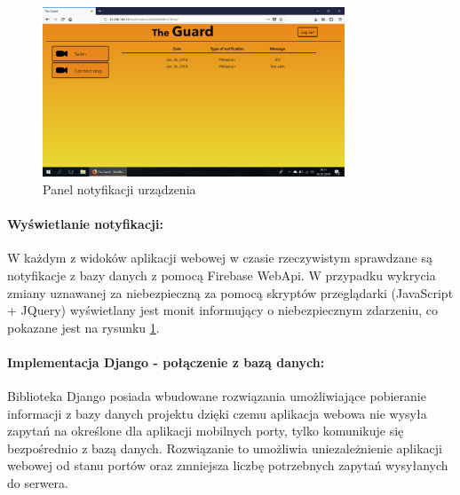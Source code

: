 \begin{figure}[ht]
	\centering
	\includegraphics[width=9cm]{web_screenshots/rasp_notifications.png}
	\caption{Panel notyfikacji urządzenia}
	\label{web_rasp_notifications}
\end{figure}
\paragraph{Wyświetlanie notyfikacji:} W każdym z widoków aplikacji webowej w czasie rzeczywistym sprawdzane są notyfikacje z bazy danych z pomocą Firebase WebApi. W przypadku wykrycia zmiany uznawanej za niebezpieczną za pomocą skryptów przeglądarki (JavaScript + JQuery) wyświetlany jest monit informujący o niebezpiecznym zdarzeniu, co pokazane jest na rysunku \ref{web_rasp_notifications}.  

\paragraph{Implementacja Django - połączenie z bazą danych:}
Biblioteka Django posiada wbudowane rozwiązania umożliwiające pobieranie informacji z bazy danych projektu dzięki czemu aplikacja webowa nie wysyła zapytań na określone dla aplikacji mobilnych porty, tylko komunikuje się bezpośrednio z bazą danych. Rozwiązanie to umożliwia uniezależnienie aplikacji webowej od stanu portów oraz zmniejsza liczbę potrzebnych zapytań wysyłanych do serwera.
